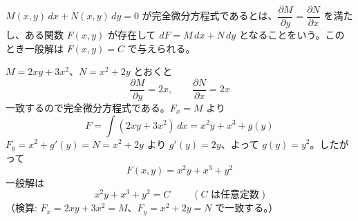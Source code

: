 
$M(x,y)\,dx + N(x,y)\,dy = 0$ が完全微分方程式であるとは、$\dfrac{\partial M}{\partial y} = \dfrac{\partial N}{\partial x}$ を満たし、ある関数 $F(x,y)$ が存在して $dF = M\,dx + N\,dy$ となることをいう。このとき一般解は $F(x,y) = C$ で与えられる。

$M = 2xy + 3x^{2}$、$N = x^{2} + 2y$ とおくと
\[
\frac{\partial M}{\partial y} = 2x, \qquad \frac{\partial N}{\partial x} = 2x
\]
一致するので完全微分方程式である。$F_x = M$ より
\[
F = \int (2xy + 3x^{2})\,dx = x^{2}y + x^{3} + g(y)
\]
$F_y = x^{2} + g'(y) = N = x^{2} + 2y$ より $g'(y) = 2y$、よって $g(y) = y^{2}$。したがって
\[
F(x,y) = x^{2}y + x^{3} + y^{2}
\]
一般解は
\[
\boxed{\; x^{2}y + x^{3} + y^{2} = C \;}
\qquad (C \text{ は任意定数})
\]
（検算: $F_x = 2xy + 3x^{2} = M$、$F_y = x^{2} + 2y = N$ で一致する。）
